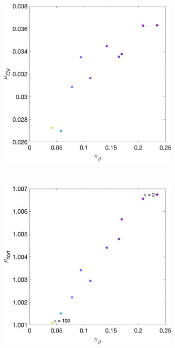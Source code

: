 \begin{figure}
  \centering
  \begin{subfigure}[]{0.32\textwidth}
    \includegraphics[width=\textwidth]{figures/micro/meanCV_vd_std_theta}
    \caption{}
  \end{subfigure}
  ~
  \begin{subfigure}[]{0.32\textwidth}
    \includegraphics[width=\textwidth]{figures/micro/meantort_vd_std_theta}

\end{subfigure}
\end{figure}

